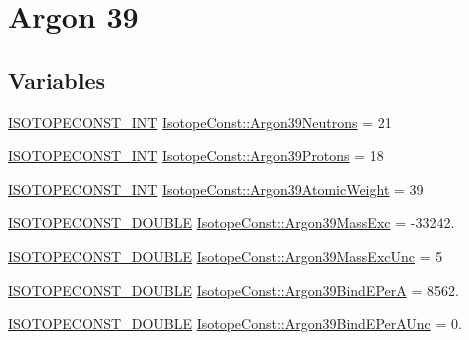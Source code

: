 \hypertarget{group___isotope_const-_argon-_ar39}{}\section{Argon 39}
\label{group___isotope_const-_argon-_ar39}
\subsection*{Variables}
\begin{DoxyCompactItemize}
\item 
\mbox{\hyperlink{group___isotope_const-_macros_ga5f18360b3e99483a35c32d789e62621c}{I\+S\+O\+T\+O\+P\+E\+C\+O\+N\+S\+T\+\_\+\+I\+NT}} \mbox{\hyperlink{group___isotope_const-_argon-_ar39_gaa96769aa43b999ac6e35bad7badac23b}{Isotope\+Const\+::\+Argon39\+Neutrons}} = 21
\item 
\mbox{\hyperlink{group___isotope_const-_macros_ga5f18360b3e99483a35c32d789e62621c}{I\+S\+O\+T\+O\+P\+E\+C\+O\+N\+S\+T\+\_\+\+I\+NT}} \mbox{\hyperlink{group___isotope_const-_argon-_ar39_ga525d1674233424191053be59ce4fca70}{Isotope\+Const\+::\+Argon39\+Protons}} = 18
\item 
\mbox{\hyperlink{group___isotope_const-_macros_ga5f18360b3e99483a35c32d789e62621c}{I\+S\+O\+T\+O\+P\+E\+C\+O\+N\+S\+T\+\_\+\+I\+NT}} \mbox{\hyperlink{group___isotope_const-_argon-_ar39_ga33e452ad1b78248d6bb51a4231b8df7e}{Isotope\+Const\+::\+Argon39\+Atomic\+Weight}} = 39
\item 
\mbox{\hyperlink{group___isotope_const-_macros_ga8f45a7272ce02c0b4c65c44636ed719a}{I\+S\+O\+T\+O\+P\+E\+C\+O\+N\+S\+T\+\_\+\+D\+O\+U\+B\+LE}} \mbox{\hyperlink{group___isotope_const-_argon-_ar39_gab00c22656d0a95cbb5754b9cccb765c1}{Isotope\+Const\+::\+Argon39\+Mass\+Exc}} = -\/33242.
\item 
\mbox{\hyperlink{group___isotope_const-_macros_ga8f45a7272ce02c0b4c65c44636ed719a}{I\+S\+O\+T\+O\+P\+E\+C\+O\+N\+S\+T\+\_\+\+D\+O\+U\+B\+LE}} \mbox{\hyperlink{group___isotope_const-_argon-_ar39_gac779dbb269507e624c65f912c96e6a48}{Isotope\+Const\+::\+Argon39\+Mass\+Exc\+Unc}} = 5
\item 
\mbox{\hyperlink{group___isotope_const-_macros_ga8f45a7272ce02c0b4c65c44636ed719a}{I\+S\+O\+T\+O\+P\+E\+C\+O\+N\+S\+T\+\_\+\+D\+O\+U\+B\+LE}} \mbox{\hyperlink{group___isotope_const-_argon-_ar39_ga8c6d6f31d40448146839c5240aaa8f21}{Isotope\+Const\+::\+Argon39\+Bind\+E\+PerA}} = 8562.
\item 
\mbox{\hyperlink{group___isotope_const-_macros_ga8f45a7272ce02c0b4c65c44636ed719a}{I\+S\+O\+T\+O\+P\+E\+C\+O\+N\+S\+T\+\_\+\+D\+O\+U\+B\+LE}} \mbox{\hyperlink{group___isotope_const-_argon-_ar39_ga99226e226b0d020eb7882e91c1b3c364}{Isotope\+Const\+::\+Argon39\+Bind\+E\+Per\+A\+Unc}} = 0.

\end{DoxyCompactItemize}
